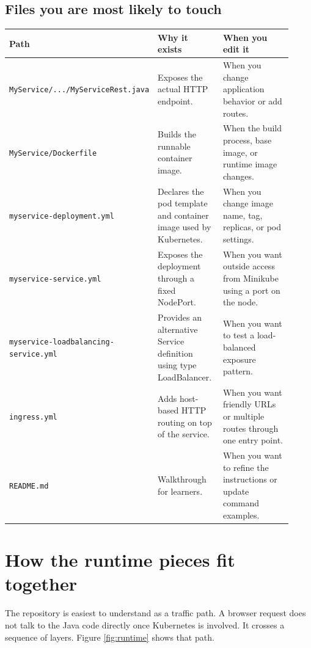 \documentclass[11pt,a4paper]{article}
\newcommand{\pathitem}[1]{\texorpdfstring{\nolinkurl{#1}}{#1}}
\begin{document}
\subsection{Files you are most likely to touch}

\small
\begin{longtable}{@{}P{0.38\linewidth}P{0.24\linewidth}P{0.30\linewidth}@{}}
\toprule
\textbf{Path} & \textbf{Why it exists} & \textbf{When you edit it} \\
\midrule
\endhead
\pathitem{MyService/.../MyServiceRest.java} & Exposes the actual HTTP endpoint. & When you change application behavior or add routes. \\
\pathitem{MyService/Dockerfile} & Builds the runnable container image. & When the build process, base image, or runtime image changes. \\
\pathitem{myservice-deployment.yml} & Declares the pod template and container image used by Kubernetes. & When you change image name, tag, replicas, or pod settings. \\
\pathitem{myservice-service.yml} & Exposes the deployment through a fixed NodePort. & When you want outside access from Minikube using a port on the node. \\
\pathitem{myservice-loadbalancing-service.yml} & Provides an alternative Service definition using type LoadBalancer. & When you want to test a load-balanced exposure pattern. \\
\pathitem{ingress.yml} & Adds host-based HTTP routing on top of the service. & When you want friendly URLs or multiple routes through one entry point. \\
\pathitem{README.md} & Walkthrough for learners. & When you want to refine the instructions or update command examples. \\
\bottomrule
\end{longtable}
\normalsize

\section{How the runtime pieces fit together}

The repository is easiest to understand as a traffic path. A browser request does not talk to the Java code directly once Kubernetes is involved. It crosses a sequence of layers. Figure \ref{fig:runtime} shows that path.
\end{document}
